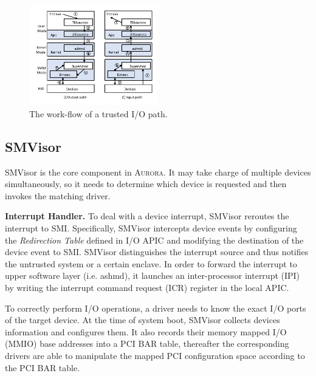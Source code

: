 \begin{figure}
	\centering
	\includegraphics[width=0.5\textwidth]{figures/workflow.pdf} %
	\caption{The work-flow of a trusted I/O path. }%
	\label{fig:workflow}
\end{figure}

\subsection{SMVisor}\label{ssv}

SMVisor is the core component in \textsc{Aurora}.  It may take charge of multiple devices simultaneously, so it needs to determine which device is requested and then invokes the matching driver. 

\textbf{Interrupt Handler.} To deal with a device interrupt, SMVisor reroutes the interrupt to SMI. Specifically, SMVisor intercepts device events by configuring the \textit{Redirection Table} defined in I/O APIC and modifying the destination of the device event to SMI. SMVisor distinguishes the interrupt source and thus notifies the untrusted system or a certain enclave. In order to forward the interrupt to upper software layer (i.e. ashmd), it launches an inter-processor interrupt (IPI) by writing the interrupt command request (ICR) register in the local APIC. 

To correctly perform I/O operations, a driver needs to know the exact I/O ports of the target device. At the time of system boot, SMVisor collects devices information and configures them. It also records their memory mapped I/O (MMIO) base addresses into a \textsf{PCI BAR table}, thereafter the corresponding drivers are able to manipulate the mapped PCI configuration space according to the \textsf{PCI BAR table}.

